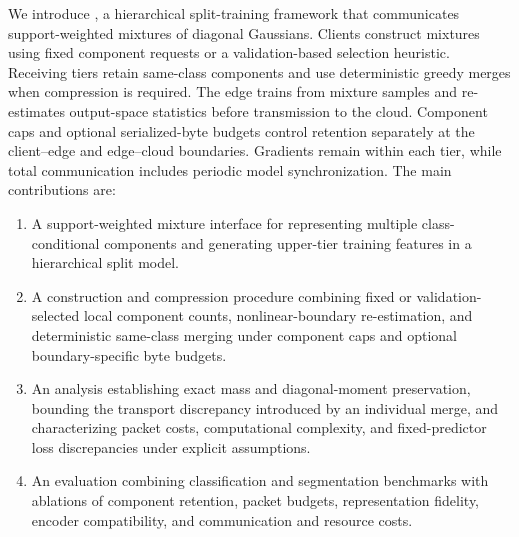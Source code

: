 We introduce \method{}, a hierarchical split-training framework that communicates support-weighted mixtures of diagonal Gaussians. Clients construct mixtures using fixed component requests or a validation-based selection heuristic. Receiving tiers retain same-class components and use deterministic greedy merges when compression is required. The edge trains from mixture samples and re-estimates output-space statistics before transmission to the cloud. Component caps and optional serialized-byte budgets control retention separately at the client--edge and edge--cloud boundaries. Gradients remain within each tier, while total communication includes periodic model synchronization.
The main contributions are:
\begin{enumerate}
    \item A support-weighted mixture interface for representing multiple class-conditional components and generating upper-tier training features in a hierarchical split model.

    \item A construction and compression procedure combining fixed or validation-selected local component counts, nonlinear-boundary re-estimation, and deterministic same-class merging under component caps and optional boundary-specific byte budgets.

    \item An analysis establishing exact mass and diagonal-moment preservation, bounding the transport discrepancy introduced by an individual merge, and characterizing packet costs, computational complexity, and fixed-predictor loss discrepancies under explicit assumptions.

    \item An evaluation combining classification and segmentation benchmarks with ablations of component retention, packet budgets, representation fidelity, encoder compatibility, and communication and resource costs.
\end{enumerate}